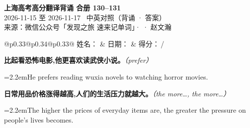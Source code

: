 \documentclass[11pt,a4paper]{article}
\newcommand{\num}[1]{\makebox[1.9em][r]{#1.}\hspace{0.3em}}
\newcommand{\prompt}[1]{\emph{\textcolor{tipblue}{\small（#1）}}}
\begin{document}
\pagestyle{plain}
\begin{center}
{\LARGE\bfseries 上海高考高分翻译背诵 \quad 合册 130–131}\\[0.25em]
{\large 2026-11-15 至 2026-11-17 \quad\ 中英对照（背诵 · 答案）}\\[0.35em]
{\footnotesize 来源：微信公众号「发现之旅 速来记单词」·  · 赵文瀚}
\end{center}

\vspace{0.4em}
\noindent\begin{tabular}{@{}p{0.33\textwidth}@{}p{0.34\textwidth}@{}p{0.33\textwidth}@{}}
姓名：\underline{\hspace{2.0cm}} & 日期：\underline{\hspace{2.0cm}} & 得分：\underline{\hspace{1.4cm}}\,/ \\
\end{tabular}

\vspace{0.5em}

\vspace{0.8em}
\vspace{0.35em}\vspace{0.15em}

\begin{minipage}{\linewidth}

\num{1}\textbf{比起看恐怖电影,他更喜欢读武侠小说。}\prompt{prefer}

\vspace{0.15em}

\noindent\hangindent=2.2em\hspace{2.2em}He prefers reading wuxia novels to watching horror movies.

\end{minipage}

\begin{minipage}{\linewidth}

\num{2}\textbf{日常用品价格涨得越高,人们的生活压力就越大。}\prompt{the more…, the more…}

\vspace{0.15em}

\noindent\hangindent=2.2em\hspace{2.2em}The higher the prices of everyday items are, the greater the pressure on people’s lives becomes.

\end{minipage}
\end{document}
